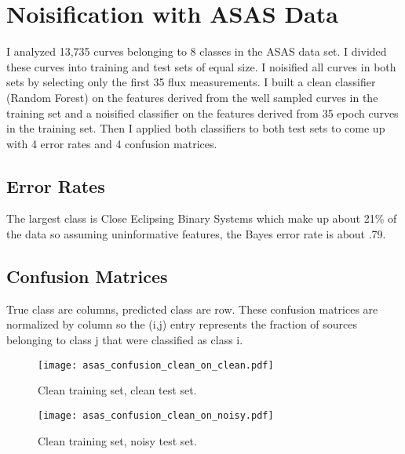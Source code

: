 \documentclass[10pt]{article}
\title{}
\date{}
\author{}
\begin{document}
\section{Noisification with ASAS Data}


I analyzed 13,735 curves belonging to 8 classes in the ASAS data set. I divided these curves into training and test sets of equal size. I noisified all curves in both sets by selecting only the first 35 flux measurements. I built a clean classifier (Random Forest) on the features derived from the well sampled curves in the training set and a noisified classifier on the features derived from 35 epoch curves in the training set. Then I applied both classifiers to both test sets to come up with 4 error rates and 4 confusion matrices. 

\subsection{Error Rates}

The largest class is Close Eclipsing Binary Systems which make up about 21\% of the data so assuming uninformative features, the Bayes error rate is about .79.




\subsection{Confusion Matrices}

True class are columns, predicted class are row. These confusion matrices are normalized by column so the (i,j) entry represents the fraction of sources belonging to class j that were classified as class i.

\begin{figure}[H]
\begin{center}
\texttt{[image: asas\_confusion\_clean\_on\_clean.pdf]}
\caption{Clean training set, clean test set.\label{fig:asas_confusion_clean_on_clean}}
\end{center}
\end{figure}

\begin{figure}[H]
\begin{center}
\texttt{[image: asas\_confusion\_clean\_on\_noisy.pdf]}
\caption{Clean training set, noisy test set.\label{fig:asas_confusion_clean_on_noisy}}
\end{center}
\end{figure}
\end{document}
